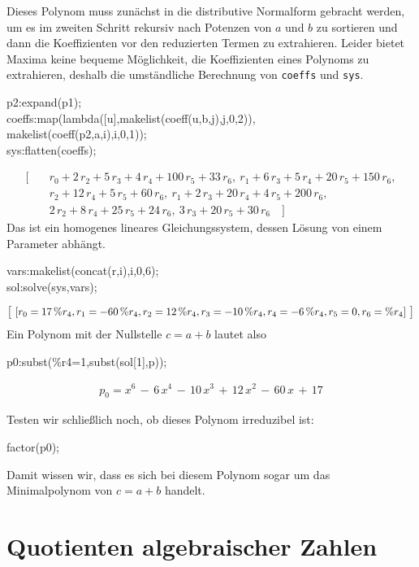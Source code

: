 \documentclass[11pt,a4paper]{article}
\newcommand{\cas}[1]{{\sc #1}}
\begin{document}
Dieses Polynom muss zunächst in die distributive Normalform gebracht werden, um
es im zweiten Schritt rekursiv nach Potenzen von $a$ und $b$ zu sortieren und
dann die Koeffizienten vor den reduzierten Termen zu extrahieren. Leider bietet
\cas{Maxima} keine bequeme Möglichkeit, die Koeffizienten eines Polynoms zu
extrahieren, deshalb die umständliche Berechnung von \texttt{coeffs} und
\texttt{sys}.
\begin{code}
  p2:expand(p1);\\
  coeffs:map(lambda([u],makelist(coeff(u,b,j),j,0,2)),\\\>\>
  makelist(coeff(p2,a,i),i,0,1));\\ 
  sys:flatten(coeffs);
\end{code}
\begin{align*}
\big[\quad & r_0 + 2\,r_2 + 5\,r_3 + 4\,r_4 + 100\,r_5 + 33\,r_6,\
 r_1 + 6\,r_3 + 5\,r_4 + 20\,r_5 + 150\,r_6,\\ 
& r_2 + 12\,r_4 + 5\,r_5 + 60\,r_6,\ 
 r_1 + 2\,r_3 + 20\,r_4 + 4\,r_5 + 200\,r_6,\\ 
& 2\,r_2 + 8\,r_4 + 25\,r_5 + 24\,r_6,\
 3\,r_3 + 20\,r_5 + 30\,r_6\quad\big]
\end{align*}
Das ist ein homogenes lineares Gleichungssystem, dessen Lösung von einem
Parameter abhängt.
\begin{code}
 vars:makelist(concat(r,i),i,0,6);\\
 sol:solve(sys,vars);
\end{code}
\begin{gather*}
  \big[\, \left[ {r_0}=17\,{\%r_4} , {r_1}=-60\, {\%r_4} , {r_2}=12\,{\%r_4} ,
      {r_3}=-10\,{\%r_4} , {r_4}=-6\,{\%r_4} , {r_5}=0 , {r_6}={\%r_4}\right]\,\big]
\end{gather*}
Ein Polynom mit der Nullstelle $c=a+b$ lautet also
\begin{code}
 p0:subst(\%r4=1,subst(sol[1],p));
\end{code}
\begin{gather*}
  p_0=x^6\,-\,6\,x^4\,-\,10\,x^3\,+\,12\,x^2\,-\,60\,x\,+\,17
\end{gather*}

Testen wir schließlich noch, ob dieses Polynom irreduzibel ist:
\begin{code}
factor(p0);
\end{code}
Damit wissen wir, dass es sich bei diesem Polynom sogar um das Minimalpolynom
von $c=a+b$ handelt.

\section{Quotienten algebraischer Zahlen}
\end{document}
